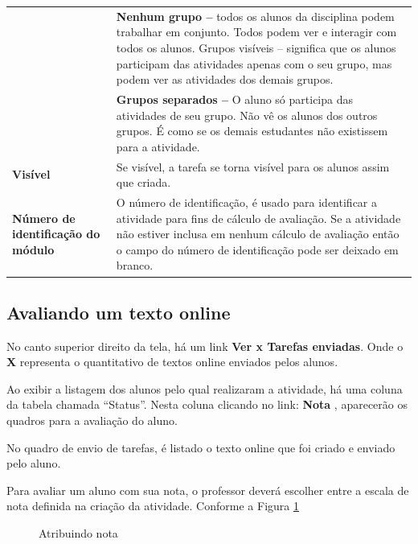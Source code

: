 \begin{longtable}{p{6cm}|p{9cm}}
&\textbf{Nenhum grupo –} todos os alunos da disciplina podem trabalhar em conjunto. Todos podem ver e interagir com todos os  alunos.  Grupos visíveis – significa que os alunos participam das atividades apenas com o seu grupo, mas podem ver as atividades dos demais grupos.\\
&\textbf{Grupos separados –} O aluno só participa das atividades de seu
grupo. Não vê os alunos dos outros grupos. É como se os demais estudantes não existissem para a atividade.
 \\\hline
    \textbf{Visível} & Se visível, a tarefa se torna visível para os alunos assim que criada.\\\hline
    \textbf{Número de identificação do módulo} & O número de identificação,  é usado para identificar a atividade para fins de cálculo de avaliação. Se a atividade não estiver inclusa em nenhum cálculo de avaliação então o campo do número de identificação pode ser deixado em branco. \\\hline
\end{longtable}%

\subsection{Avaliando um texto online}
No canto superior direito da tela, há um link  \textbf{Ver x Tarefas enviadas}. Onde o \textbf{X}  representa o quantitativo de textos online enviados pelos alunos.

Ao exibir a listagem dos alunos pelo qual realizaram a atividade, há uma coluna da tabela chamada “Status”. Nesta coluna clicando no link:\textbf{ Nota }, aparecerão os quadros para a avaliação do aluno.

No quadro de envio de tarefas, é listado o texto online que foi criado e enviado pelo aluno.

Para avaliar um aluno com sua nota, o professor deverá escolher entre a escala de nota definida na criação da atividade. Conforme a Figura \ref{fig:cap5_33}

\begin{figure}[!htbp]
 \begin{center}
\caption{Atribuindo nota}
  \label{fig:cap5_33}
 \end{center}
\end{figure}

